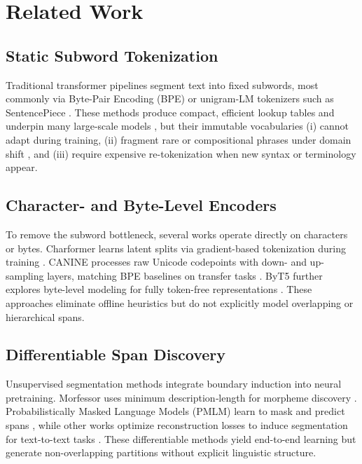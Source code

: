 \section{Related Work}

\subsection{Static Subword Tokenization}
Traditional transformer pipelines segment text into fixed subwords, most commonly via Byte-Pair Encoding (BPE) \cite{sennrich2016bpe} or unigram‐LM tokenizers such as SentencePiece \cite{kudo2018sentencepiece}.  These methods produce compact, efficient lookup tables and underpin many large-scale models \cite{vaswani2017attention,devlin2019bert,raffel2020t5}, but their immutable vocabularies (i) cannot adapt during training, (ii) fragment rare or compositional phrases under domain shift \cite{galle2021respite}, and (iii) require expensive re-tokenization when new syntax or terminology appear.

\subsection{Character- and Byte-Level Encoders}
To remove the subword bottleneck, several works operate directly on characters or bytes.  Charformer learns latent splits via gradient-based tokenization during training \cite{tay2021charformer}.  CANINE processes raw Unicode codepoints with down- and up-sampling layers, matching BPE baselines on transfer tasks \cite{clark2021canine}.  ByT5 further explores byte-level modeling for fully token-free representations \cite{xue2022byt5}.  These approaches eliminate offline heuristics but do not explicitly model overlapping or hierarchical spans.

\subsection{Differentiable Span Discovery}
Unsupervised segmentation methods integrate boundary induction into neural pretraining.  Morfessor uses minimum description‐length for morpheme discovery \cite{creutz2005unsupervised}.  Probabilistically Masked Language Models (PMLM) learn to mask and predict spans \cite{liu2022pmlm}, while other works optimize reconstruction losses to induce segmentation for text-to-text tasks \cite{liu2022learnedsegmentation}.  These differentiable methods yield end-to-end learning but generate non-overlapping partitions without explicit linguistic structure.

